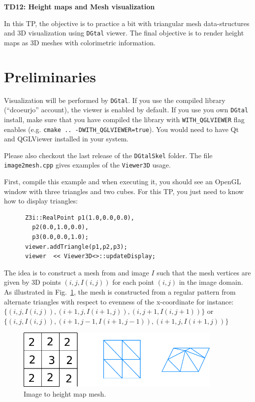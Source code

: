 \documentclass[a4paper, 11pt]{article}
\title{}
\author{}
\date{}
\begin{document}
\begin{center}
	\LARGE \textbf{TD12: Height maps and Mesh visualization}
\end{center}

\bigskip
\par In this TP, the objective is to practice a bit with triangular
mesh data-structures and 3D visualization using \texttt{DGtal}
viewer. The final objective is to render height maps as 3D meshes with
colorimetric information.

\section{Preliminaries}

Visualization will be performed by \texttt{DGtal}. If you use the
compiled library (``dcoeurjo'' account), the viewer is enabled by
default. If you use you own \texttt{DGtal} install, make sure that you
have compiled the library with \texttt{WITH\_QGLVIEWER} flag enables
(e.g. \texttt{cmake .. -DWITH\_QGLVIEWER=true}). You would need to
have Qt and QGLViewer installed in your system.

Please also checkout the last release of the \texttt{DGtalSkel} folder. The
file \texttt{image2mesh.cpp} gives examples of the \texttt{Viewer3D}
usage.

First, compile this example and when executing it, you should see an OpenGL
window with three triangles and two cubes.  For this TP, you just need
to know how to display triangles:
\begin{verbatim}
      Z3i::RealPoint p1(1.0,0.0,0.0),
        p2(0.0,1.0,0.0),
        p3(0.0,0.0,1.0);
      viewer.addTriangle(p1,p2,p3);
      viewer  << Viewer3D<>::updateDisplay;
\end{verbatim}


The idea is to construct a mesh from and image $I$ such that the mesh
vertices are given by 3D points $(i,j, I(i,j))$ for each point $(i,j)$
in the image domain.  As illustrated in Fig.~\ref{fig:image}, the mesh
is constructed from a regular pattern from alternate triangles with
respect to evenness of the x-coordinate for instance: $\{(i,j,I(i,j)),
(i+1,j,I(i+1,j)), (i,j+1,I(i,j+1))\}$ or $\{(i,j,I(i,j)),
(i+1,j-1,I(i+1,j-1)), (i+1,j,I(i+1,j))\}$

\begin{figure}[h]
  \begin{center}
    \includegraphics[width=10cm]{image2mesh}
  \end{center}
  \caption{Image to height map mesh.}
  \label{fig:image}
\end{figure}
\end{document}
